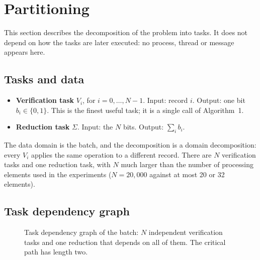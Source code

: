 \documentclass[11pt,a4paper]{article}
\begin{document}
\section{Partitioning}\label{sec:partitioning}

This section describes the decomposition of the problem into tasks. It does not depend on how the tasks are later executed: no process, thread or message appears here.

\subsection{Tasks and data}

\begin{itemize}[nosep]
  \item \textbf{Verification task} $V_i$, for $i=0,\dots,N-1$. Input: record $i$. Output: one bit $b_i\in\{0,1\}$. This is the finest useful task; it is a single call of Algorithm~1.
  \item \textbf{Reduction task} $\Sigma$. Input: the $N$ bits. Output: $\sum_i b_i$.
\end{itemize}

The data domain is the batch, and the decomposition is a domain decomposition: every $V_i$ applies the same operation to a different record. There are $N$ verification tasks and one reduction task, with $N$ much larger than the number of processing elements used in the experiments ($N=20{,}000$ against at most 20 or 32 elements).

\subsection{Task dependency graph}

\begin{figure}[H]
\centering
{}
\caption{Task dependency graph of the batch: $N$ independent verification tasks and one reduction that depends on all of them. The critical path has length two.}
\end{figure}
\end{document}
